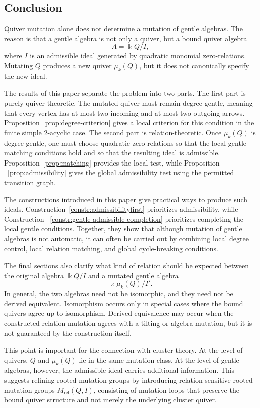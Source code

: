 \documentclass[11pt]{article}
\newcommand{\K}{\Bbbk}
\theoremstyle{plain}
\theoremstyle{definition}
\theoremstyle{remark}
\begin{document}
\subsection{Conclusion}

Quiver mutation alone does not determine a mutation of gentle algebras.  The
reason is that a gentle algebra is not only a quiver, but a bound quiver
algebra
\[
  A=\K Q/I,
\]
where \(I\) is an admissible ideal generated by quadratic monomial
zero-relations.  Mutating \(Q\) produces a new quiver \(\mu_k(Q)\), but it does
not canonically specify the new ideal.

The results of this paper separate the problem into two parts.  The first part
is purely quiver-theoretic.  The mutated quiver must remain degree-gentle,
meaning that every vertex has at most two incoming and at most two outgoing
arrows.  Proposition~\ref{prop:degree-criterion} gives a local criterion for
this condition in the finite simple \(2\)-acyclic case.  The second part is
relation-theoretic.  Once \(\mu_k(Q)\) is degree-gentle, one must choose
quadratic zero-relations so that the local gentle matching conditions hold and
so that the resulting ideal is admissible.  Proposition~\ref{prop:matching}
provides the local test, while Proposition ~\ref{prop:admissibility} gives the
global admissibility test using the permitted transition graph.

The constructions introduced in this paper give practical ways to produce such
ideals.  Construction~\ref{constr:admissibilityfirst} prioritizes
admissibility, while Construction  ~\ref{constr:gentle-admissible-completion}
prioritizes completing the local gentle conditions.  Together, they show that
although mutation of gentle algebras is not automatic, it can often be carried
out by combining local degree control, local relation matching, and global
cycle-breaking conditions.

The final sections also clarify what kind of relation should be expected
between the original algebra \(\K Q/I\) and a mutated gentle algebra
\[
  \K\mu_k(Q)/I'.
\]
In general, the two algebras need not be isomorphic, and they need not be
derived equivalent.  Isomorphism occurs only in special cases where the bound
quivers agree up to isomorphism.  Derived equivalence may occur when the
constructed relation mutation agrees with a tilting or algebra mutation, but it
is not guaranteed by the construction itself.

This point is important for the connection with cluster theory.  At the level
of quivers, \(Q\) and \(\mu_k(Q)\) lie in the same mutation class.  At the
level of gentle algebras, however, the admissible ideal carries additional
information.  This suggests refining rooted mutation groups by introducing
relation-sensitive rooted mutation groups \(M_{\mathrm{rel}}(Q,I)\), consisting
of mutation loops that preserve the bound quiver structure and not merely the
underlying cluster quiver.
\end{document}
